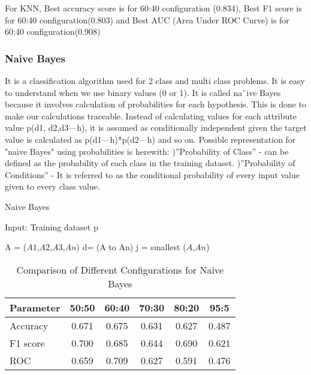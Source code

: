 \documentclass{article}
\begin{document}
\bigskip

For KNN,
Best accuracy score is for 60:40 configuration (0.834),
Best F1 score is for 60:40 configuration(0.803) and
Best AUC (Area Under ROC Curve) is for 60:40 configuration(0.908)

\newpage

 \subsubsection{Naive Bayes}
It is a classification algorithm used for 2 class and multi class problems. It
is easy to understand when we use binary values (0 or 1). It is called na¨ive
Bayes because it involves calculation of probabilities for each hypothesis. This
is done to make our calculations traceable. Instead of calculating values for each
attribute value p(d1, d2,d3—h), it is assumed as conditionally independent given
the target value is calculated as p(d1—h)*p(d2—h) and so on. 
Possible representation for "naive Bayes" using probabilities is herewith:
)''Probability of Class'' -  can be defined as the probability of each class in the training dataset.
)''Probability of Conditions'' -  It is referred to as the  conditional probability of every input value
given to every class value.

\begin{algorithm}[!h] %
\caption{Naive Bayes} %
\label{algo1}
Input: Training dataset p


\begin{algorithmic}[1]

\State A = {($A1$,$A2$,$A3$,$An$)}
\State d= (A to An)
\EndFor
\State j = {smallest} {($A$,$An$)} 

\EndProcedure
\end{algorithmic}
\end{algorithm}

\begin{table}[!h]
\centering
\begin{tabular}{|l|c|c|c|c|c|}
\hline
\textbf{Parameter} &  \textbf{50:50} &  \textbf{60:40} &  \textbf{70:30} &  \textbf{80:20} &  \textbf{95:5} \\
\hline
Accuracy & 0.671 & 0.675 & 0.631 & 0.627 & 0.487 \\
\hline
F1 score & 0.700 & 0.685 & 0.644 & 0.690 & 0.621 \\
\hline
ROC & 0.659 & 0.709 & 0.627 & 0.591 & 0.476 \\
\hline


\end{tabular}
\caption{Comparison of Different Configurations for Naive Bayes}
\label{tbl:dataset}
\end{table}
\bigskip
\end{document}
